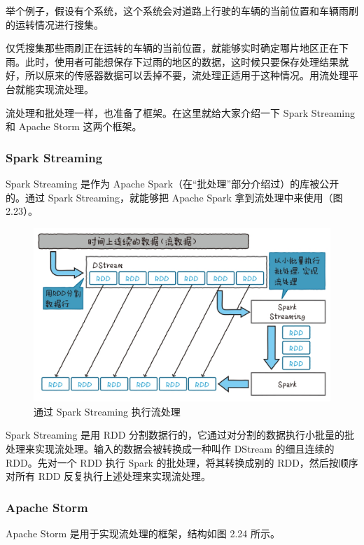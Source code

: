 \documentclass[12pt,UTF8]{ctexbook}
\begin{document}
举个例子，假设有个系统，这个系统会对道路上行驶的车辆的当前位置和车辆雨刷的运转情况进行搜集。

仅凭搜集那些雨刷正在运转的车辆的当前位置，就能够实时确定哪片地区正在下雨。此时，使用者可能想保存下过雨的地区的数据，这时候只要保存处理结果就好，所以原来的传感器数据可以丢掉不要，流处理正适用于这种情况。用流处理平台就能实现流处理。

流处理和批处理一样，也准备了框架。在这里就给大家介绍一下 Spark Streaming 和 Apache Storm 这两个框架。

\subsubsection{Spark Streaming}

Spark Streaming 是作为 Apache Spark（在“批处理”部分介绍过）的库被公开的。通过 Spark Streaming，就能够把 Apache Spark 拿到流处理中来使用（图 2.23）。

\begin{figure}[htbp]
	\centering
	\includegraphics[width=1\linewidth]{42}
	\caption{通过 Spark Streaming 执行流处理}
	\label{fig:1}
\end{figure}

Spark Streaming 是用 RDD 分割数据行的，它通过对分割的数据执行小批量的批处理来实现流处理。输入的数据会被转换成一种叫作 DStream 的细且连续的 RDD。先对一个 RDD 执行 Spark 的批处理，将其转换成别的 RDD，然后按顺序对所有 RDD 反复执行上述处理来实现流处理。

\subsubsection{Apache Storm}

Apache Storm 是用于实现流处理的框架，结构如图 2.24 所示。
\end{document}
